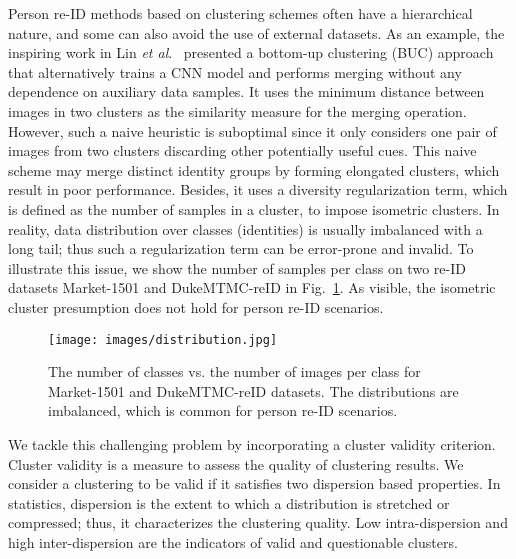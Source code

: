 \documentclass[journal]{IEEEtran}
\newcommand{\etal}{\textit{et al}.}
\begin{document}
Person re-ID methods based on clustering schemes often have a hierarchical nature, and some can also avoid the use of external datasets. As an example, the inspiring work in Lin \etal\ \cite{lin2019bottom} presented a bottom-up clustering (BUC) approach that alternatively trains a CNN model and performs merging without any dependence on auxiliary data samples. It uses the minimum distance between images in two clusters as the similarity measure for the merging operation. However, such a naive heuristic is suboptimal since it only considers one pair of images from two clusters discarding other potentially useful cues. This naive scheme may merge distinct identity groups by forming elongated clusters, which result in poor performance. Besides, it uses a diversity regularization term, which is defined as the number of samples in a cluster, to impose isometric clusters. In reality, data distribution over classes (identities) is usually imbalanced with a long tail; thus such a regularization term can be error-prone and invalid. To illustrate this issue, we show the number of samples per class on two re-ID datasets Market-1501 and DukeMTMC-reID in Fig.~\ref{fig:distribution}. As visible, the isometric cluster presumption does not hold for person re-ID scenarios. 



\begin{figure}[tb]
\begin{center}
    \centering
    \texttt{[image: images/distribution.jpg]}
    \caption{The number of classes vs. the number of images per class for Market-1501 and DukeMTMC-reID datasets. The distributions are imbalanced, which is common for person re-ID scenarios. }
    \label{fig:distribution}
    \end{center}
\end{figure} 
We tackle this challenging problem by incorporating a cluster validity criterion. Cluster validity is a measure to assess the quality of clustering results. We consider a clustering to be valid if it satisfies two dispersion based properties. In statistics, dispersion is the extent to which a distribution is stretched or compressed; thus, it characterizes the clustering quality. Low intra-dispersion and high inter-dispersion are the indicators of valid and questionable clusters. 
\end{document}
